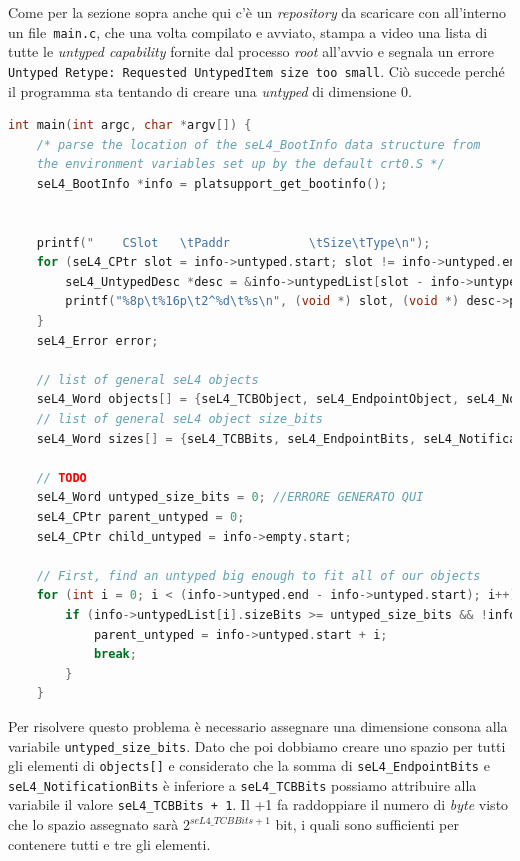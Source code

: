 Come per la sezione sopra anche qui c'è un \textit{repository} da scaricare con all'interno un file\texttt{ main.c}, che una volta compilato e avviato, stampa a video una lista di tutte le \textit{untyped capability} fornite dal processo \textit{root} all'avvio e segnala un errore \texttt{Untyped Retype: Requested UntypedItem size too small}. Ciò succede perché il programma sta tentando di creare una \textit{untyped} di dimensione 0.
\begin{lstlisting}[language=C++]
int main(int argc, char *argv[]) {
    /* parse the location of the seL4_BootInfo data structure from
    the environment variables set up by the default crt0.S */
    seL4_BootInfo *info = platsupport_get_bootinfo();


    printf("    CSlot   \tPaddr           \tSize\tType\n");
    for (seL4_CPtr slot = info->untyped.start; slot != info->untyped.end; slot++) {
        seL4_UntypedDesc *desc = &info->untypedList[slot - info->untyped.start];
        printf("%8p\t%16p\t2^%d\t%s\n", (void *) slot, (void *) desc->paddr, desc->sizeBits, desc->isDevice ? "device untyped" : "untyped");
    }
    seL4_Error error;

    // list of general seL4 objects
    seL4_Word objects[] = {seL4_TCBObject, seL4_EndpointObject, seL4_NotificationObject};
    // list of general seL4 object size_bits
    seL4_Word sizes[] = {seL4_TCBBits, seL4_EndpointBits, seL4_NotificationBits};
    
    // TODO
    seL4_Word untyped_size_bits = 0; //ERRORE GENERATO QUI
    seL4_CPtr parent_untyped = 0;
    seL4_CPtr child_untyped = info->empty.start;

    // First, find an untyped big enough to fit all of our objects
    for (int i = 0; i < (info->untyped.end - info->untyped.start); i++) {
        if (info->untypedList[i].sizeBits >= untyped_size_bits && !info->untypedList[i].isDevice) {
            parent_untyped = info->untyped.start + i;
            break;
        }
    }
\end{lstlisting}

Per risolvere questo problema è necessario assegnare una dimensione consona alla variabile \texttt{untyped\_size\_bits}. Dato che poi dobbiamo creare uno spazio per tutti gli elementi di \texttt{objects[]} e considerato che la somma di \texttt{seL4\_EndpointBits} e \texttt{seL4\_NotificationBits} è inferiore a \texttt{seL4\_TCBBits} possiamo attribuire alla variabile il valore \texttt{seL4\_TCBBits + 1}. Il +1 fa raddoppiare il numero di \textit{byte} visto che lo spazio assegnato sarà $ 2^{seL4\_TCBBits + 1} $ bit, i quali sono sufficienti per contenere tutti e tre gli elementi.


